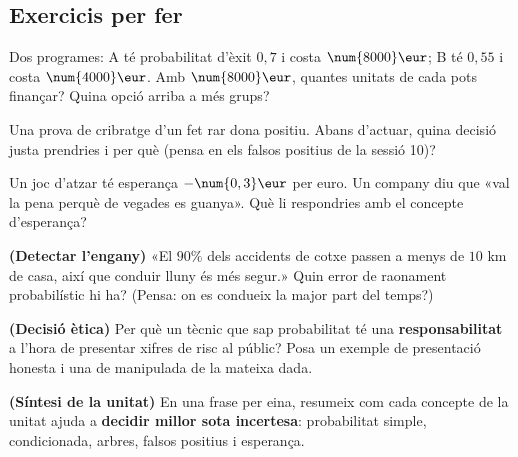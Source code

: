 \subsection{Exercicis per fer}

\begin{exercicis}
\begin{exlist}
  \item Dos programes: A té probabilitat d'èxit $0,7$ i costa $\num{8000}\eur$; B té
        $0,55$ i costa $\num{4000}\eur$. Amb $\num{8000}\eur$, quantes unitats de cada
        pots finançar? Quina opció arriba a més grups?
  \item Una prova de cribratge d'un fet rar dona positiu. Abans d'actuar, quina decisió
        justa prendries i per què (pensa en els falsos positius de la sessió 10)?
  \item Un joc d'atzar té esperança $-\num{0,3}\eur$ per euro. Un company diu que «val la
        pena perquè de vegades es guanya». Què li respondries amb el concepte
        d'esperança?
  \item \textbf{(Detectar l'engany)} «El $90\%$ dels accidents de cotxe passen a menys de
        $\num{10}$ km de casa, així que conduir lluny és més segur.» Quin error de
        raonament probabilístic hi ha? (Pensa: on es condueix la major part del temps?)
  \item \textbf{(Decisió ètica)} Per què un tècnic que sap probabilitat té una
        \textbf{responsabilitat} a l'hora de presentar xifres de risc al públic? Posa un
        exemple de presentació honesta i una de manipulada de la mateixa dada.
  \item \textbf{(Síntesi de la unitat)} En una frase per eina, resumeix com cada concepte
        de la unitat ajuda a \textbf{decidir millor sota incertesa}: probabilitat simple,
        condicionada, arbres, falsos positius i esperança.
\end{exlist}
\end{exercicis}

